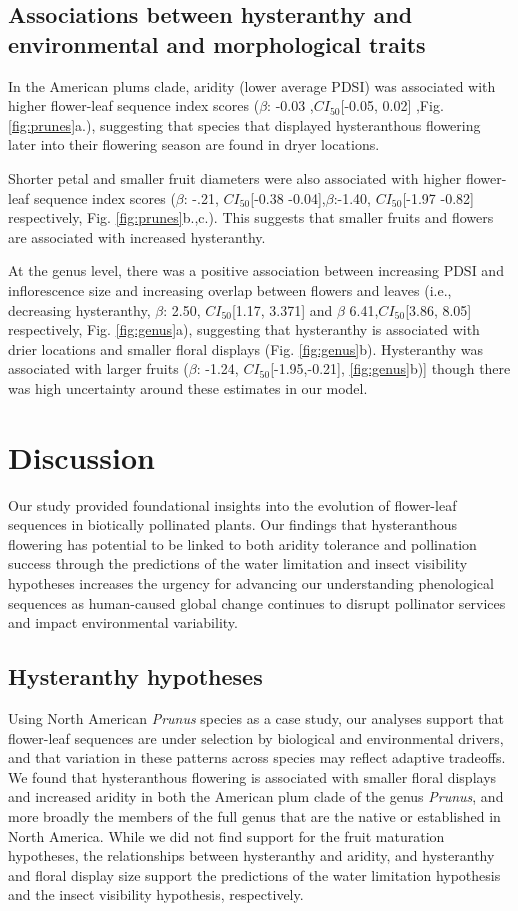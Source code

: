 \documentclass{article}[11pt]
\begin{document}
{\subsection*{Associations between hysteranthy and environmental and morphological traits}
In the American plums clade, aridity (lower average PDSI) was associated with higher flower-leaf sequence index scores ($\beta$: -0.03 ,$CI_{50}$[-0.05,  0.02] ,Fig. \ref{fig:prunes}a.), suggesting that species that displayed hysteranthous flowering later into their flowering season are found in dryer locations. 

Shorter petal and smaller fruit diameters were also associated with higher flower-leaf sequence index scores ($\beta$: -.21, $CI_{50}$[-0.38 -0.04],$\beta$:-1.40, $CI_{50}$[-1.97 -0.82] respectively, Fig. \ref{fig:prunes}b.,c.). This suggests that smaller fruits and flowers are associated with increased hysteranthy.

At the genus level, there was a positive association between increasing PDSI and inflorescence size and increasing overlap between flowers and leaves (i.e., decreasing hysteranthy, $\beta$: 2.50, $CI_{50}$[1.17, 3.371] and $\beta$ 6.41,$CI_{50}$[3.86, 8.05] respectively, Fig. \ref{fig:genus}a), suggesting that hysteranthy is associated with drier locations and smaller floral displays (Fig. \ref{fig:genus}b). Hysteranthy was associated with larger fruits  ($\beta$: -1.24, $CI_{50}$[-1.95,-0.21], \ref{fig:genus}b)]  though there was high uncertainty around these estimates in our model. 

\section*{Discussion}
Our study provided foundational insights into the evolution of flower-leaf sequences in biotically pollinated plants. Our findings that hysteranthous flowering has potential to be linked to both aridity tolerance and  pollination success through the predictions of the water limitation and insect visibility hypotheses increases the urgency for advancing our understanding phenological sequences as human-caused global change continues to disrupt pollinator services and impact environmental variability. 

\subsection*{Hysteranthy hypotheses}
Using North American \textit{Prunus} species as a case study, our analyses support that flower-leaf sequences are under selection by biological and environmental drivers, and that variation in these patterns across species may reflect adaptive tradeoffs. We found that hysteranthous flowering is associated with smaller floral displays and increased aridity in both the American plum clade of the genus \emph{Prunus}, and more broadly the members of the full genus that are the native or established in North America. While we did not find support for the fruit maturation hypotheses, the relationships between hysteranthy and aridity, and hysteranthy and floral display size support the predictions of the water limitation hypothesis and the insect visibility hypothesis, respectively. 

}
\end{document}
